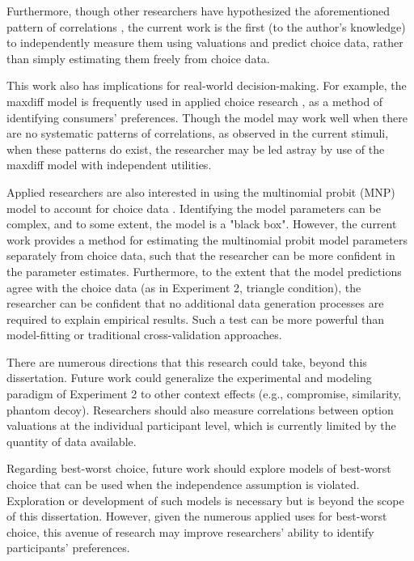 Furthermore, though other researchers have hypothesized the aforementioned pattern of correlations \parencite{kamakura1984predicting,natenzon2019random}, the current work is the first (to the author's knowledge) to independently measure them using valuations and predict choice data, rather than simply estimating them freely from choice data.

This work also has implications for real-world decision-making. For example, the maxdiff model is frequently used in applied choice research \parencite{cheung2016using,beck2016best,flynn2014best,flynnBestWorstScaling2007,muhlbacher2016experimental}, as a method of identifying consumers' preferences. Though the model may work well when there are no systematic patterns of correlations, as observed in the current stimuli, when these patterns do exist, the researcher may be led astray by use of the maxdiff model with independent utilities. 

Applied researchers are also interested in using the multinomial probit (MNP) model to account for choice data \parencite{train2009discrete}. Identifying the model parameters can be complex, and to some extent, the model is a "black box". However, the current work provides a method for estimating the multinomial probit model parameters separately from choice data, such that the researcher can be more confident in the parameter estimates. Furthermore, to the extent that the model predictions agree with the choice data (as in Experiment 2, triangle condition), the researcher can be confident that no additional data generation processes are required to explain empirical results. Such a test can be more powerful than model-fitting or traditional cross-validation approaches.

There are numerous directions that this research could take, beyond this dissertation. Future work could generalize the experimental and modeling paradigm of Experiment 2 to other context effects (e.g., compromise, similarity, phantom decoy). Researchers should also measure correlations between option valuations at the individual participant level, which is currently limited by the quantity of data available. 

Regarding best-worst choice, future work should explore models of best-worst choice that can be used when the independence assumption is violated. Exploration or development of such models is necessary but is beyond the scope of this dissertation. However, given the numerous applied uses for best-worst choice, this avenue of research may improve researchers' ability to identify participants' preferences. 

